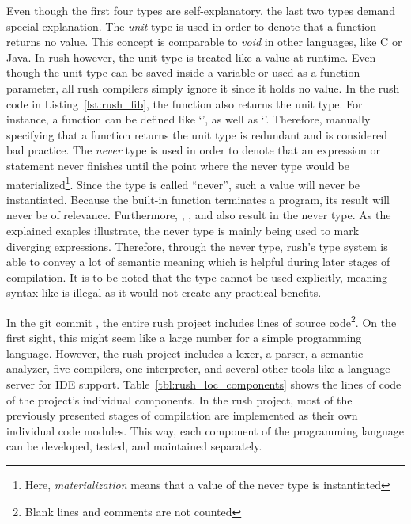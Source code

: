 Even though the first four types are self-explanatory, the last two types demand special explanation.
The \emph{unit} type is used in order to denote that a function returns no value.
This concept is comparable to \emph{void} in other languages, like C or Java.
In rush however, the unit type is treated like a value at runtime.
Even though the unit type can be saved inside a variable or used as a function parameter, all rush compilers simply ignore it since it holds no value.
In the rush code in Listing~\ref{lst:rush_fib}, the  function also returns the unit type.
For instance, a function  can be defined like `', as well as `'.
Therefore, manually specifying that a function returns the unit type is redundant and is considered bad practice.
The \emph{never} type is used in order to denote that an expression or statement never finishes until the point where the never type would be materialized\footnote{Here, \emph{materialization} means that a value of the never type is instantiated}.
Since the type is called \enquote{never}, such a value will never be instantiated.
Because the built-in  function terminates a program, its result will never be of relevance.
Furthermore, , , and  also result in the never type.
As the explained exaples illustrate, the never type is mainly being used to mark diverging expressions.
Therefore, through the never type, rush's type system is able to convey a lot of semantic meaning which is helpful during later stages of compilation.
It is to be noted that the type cannot be used explicitly, meaning syntax like  is illegal as it would not create any practical benefits.

In the git commit \rushCommit, the entire rush project includes
 lines of source code\footnote{Blank lines and comments are not counted}.
On the first sight, this might seem like a large number for a simple programming language.
However, the rush project includes a lexer, a parser, a semantic analyzer, five compilers, one interpreter, and several other tools like a language server for IDE support.
Table~\ref{tbl:rush_loc_components} shows the lines of code of the project's individual components.
In the rush project, most of the previously presented stages of compilation are implemented as their own individual code modules.
This way, each component of the programming language can be developed, tested, and maintained separately.

